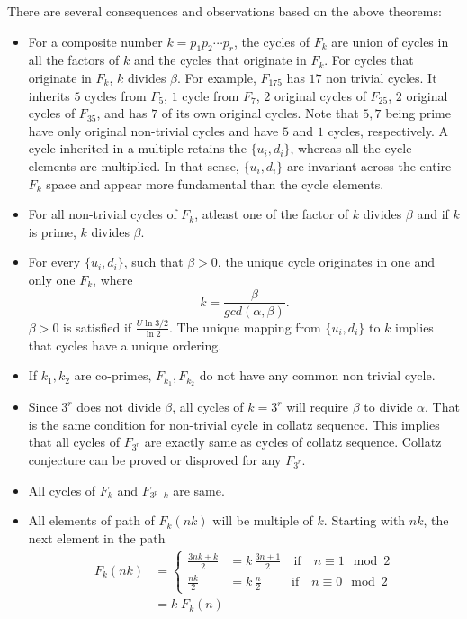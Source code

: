 \documentclass[12pt]{article} %
\begin{document}
\noindent
There are several consequences and observations based on the above theorems:
\begin{itemize}
    \item For a composite number $k = p_1 p_2 \cdots p_r$, the cycles of $F_k$ are union of cycles in all the factors of $k$ and the cycles that originate in $F_k$. For cycles that originate in $F_k$, $k$ divides $\beta$. For example, $F_{175}$ has $17$ non trivial cycles. It inherits $5$ cycles from $F_5$, $1$ cycle from $F_7$, $2$ original cycles of $F_{25}$, $2$ original cycles of $F_{35}$, and has $7$ of its own original cycles. Note that $5, 7$ being prime have only original non-trivial cycles and have $5$ and $1$ cycles, respectively. A cycle inherited in a multiple retains the $\{u_i, d_i\}$, whereas all the cycle elements are multiplied. In that sense, $\{u_i, d_i\}$ are invariant across the entire $F_k$ space and appear more fundamental than the cycle elements.   
    
    \item For all non-trivial cycles of $F_k$, atleast one of the factor of $k$ divides $\beta$ and if $k$ is prime, $k$ divides $\beta$.
    
    \item For every $\{u_i, d_i\}$, such that $\beta > 0$, the unique cycle originates in one and only one $F_k$, where
    \[ 
        k  = \frac{\beta}{gcd(\alpha, \beta)}.
    \]
    $\beta > 0$ is satisfied if $\frac{U \ln{3/2}}{\ln{2}}$. The unique mapping from $\{u_i, d_i\}$ to $k$ implies that cycles have a unique ordering. 
       
    \item If $k_1, k_2$ are co-primes, $F_{k_1}, F_{k_2}$ do not have any common non trivial cycle.
   
    \item Since $3^r$ does not divide $\beta$, all cycles of $k=3^r$ will require $\beta$ to divide $\alpha$. That is the same condition for non-trivial cycle in collatz sequence. This implies that all cycles of $F_{3^r}$ are exactly same as cycles of collatz sequence. Collatz conjecture can be proved or disproved for any $F_{3^r}$.
    
     
    \item All cycles of $F_k$ and $F_{3^p \cdot k}$ are same.
    
    \item All elements of path of $F_k(n k)$ will be multiple of $k$. Starting with $n k$, the next element in the path
\begin{align*}
F_k(n k) & =  
    \begin{cases} 
   \frac{3nk + k}{2} & = k \, \frac{3n + 1}{2} \quad  \text{if} \quad n \equiv 1 \mod 2\\
   \frac{nk}{2}  & = k \, \frac{n}{2}  \quad    \quad \: \,  \text{if} \quad n \equiv 0 \mod 2
   \end{cases}\\
   & = k \; F_k(n)
\end{align*}   
   

\end{itemize}
\end{document}
